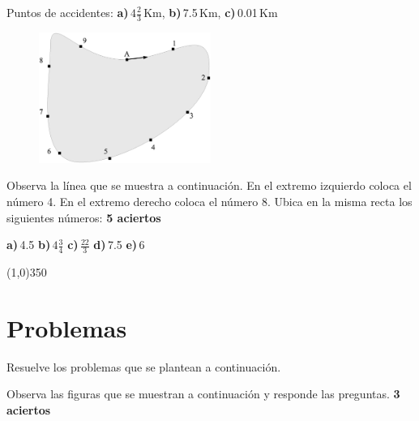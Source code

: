 \documentclass[11pt]{article}
\begin{document}
Puntos de accidentes: \hspace{3mm} \textbf{a)}\,$4\frac{2}{3}$\,Km, \hspace{3mm}
\textbf{b)}\,7.5\,Km, \hspace{3mm} \textbf{c)}\,0.01\,Km

\begin{figure}[h!]
    \begin{center}
        \includegraphics[width=0.5\textwidth]{./pista}
    \end{center}
\end{figure}

\newpage

Observa la l\'inea que se muestra a continuaci\'on. En el extremo izquierdo
coloca el n\'umero 4. En el extremo derecho coloca el n\'umero 8. Ubica en la
misma recta los siguientes n\'umeros:  \hfill \textbf{5 aciertos}

\textbf{a)}\,4.5 \hfill \textbf{b)}\,$4\displaystyle\frac{3}{4}$ \hfill
\textbf{c)}\,$\displaystyle\frac{22}{3} $ \hfill \textbf{d)}\,7.5 \hfill
\textbf{e)}\,6

\vspace{1.5cm}

\begin{center}
\line(1,0){350}
\end{center}

\vspace{1.5cm}

\section{Problemas}
Resuelve los problemas que se plantean a continuaci\'on.

\vspace{5mm}

Observa las figuras que se muestran a continuaci\'on y responde las preguntas.
\hfill \textbf{3 aciertos}
\end{document}
